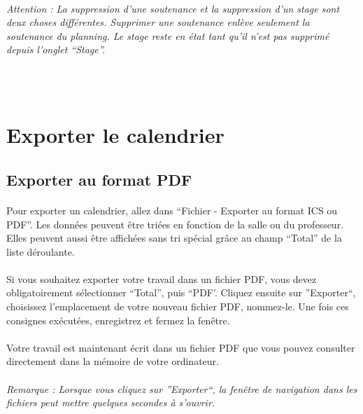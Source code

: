 \documentclass[a4paper,10pt]{report}
\begin{document}
      \paragraph{}
	\textit{Attention : La suppression d'une soutenance et la suppression d'un stage sont deux choses différentes. Supprimer une soutenance enlève seulement la soutenance du planning. Le stage reste en état tant qu'il n'est pas supprimé depuis l'onglet ``Stage''.}
      
      ~\\~\\
    \section{Exporter le calendrier}
      \subsection{Exporter au format PDF}
      
	\paragraph{}
	  Pour exporter un calendrier, allez dans ``Fichier - Exporter au format ICS ou PDF''.
	  Les données peuvent être triées en fonction de la salle ou du professeur.
	  Elles peuvent aussi être affichées sans tri spécial grâce au champ ``Total'' de la liste déroulante.
	  
	\paragraph{}
	  Si vous souhaitez exporter votre travail dans un fichier PDF, vous devez obligatoirement sélectionner ``Total'', puis ``PDF'.
	  Cliquez ensuite sur ''Exporter``, choisissez l'emplacement de votre nouveau fichier PDF, nommez-le.
	  Une fois ces consignes exécutées, enregistrez et fermez la fenêtre.
	
	\paragraph{}
	  Votre travail est maintenant écrit dans un fichier PDF que vous pouvez consulter directement dans la mémoire de votre ordinateur.

	\paragraph{}
	  \textit{Remarque : Lorsque vous cliquez sur ''Exporter``, la fenêtre de navigation dans les fichiers peut mettre quelques secondes à s'ouvrir.}
	
\end{document}
